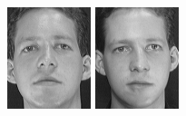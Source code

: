 \begin{figure}[ht]
 \includegraphics[width=\columnwidth/11]{ch3/figures/s1_7.png}
 \includegraphics[width=\columnwidth/11]{ch3/figures/s1_8.png}

\end{figure}

